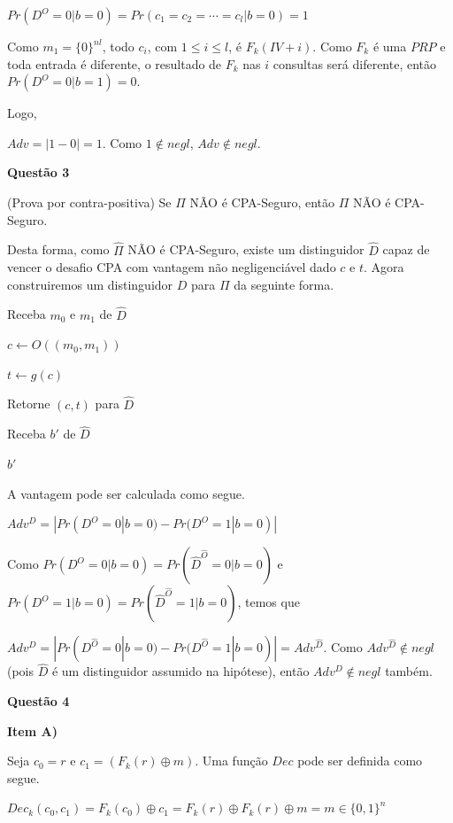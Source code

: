 \documentclass{article}
\begin{document}
    $Pr(D^O = 0 | b = 0) = Pr(c_1 = c_2 = \cdots = c_l | b = 0) = 1$

    Como $m_1 = \{0\}^{nl}$, todo $c_i$, com $1 \leq i \leq l$, é $F_k(IV + i)$. Como $F_k$ é uma $PRP$ e toda entrada é diferente, o resultado de $F_k$ nas $i$ consultas será diferente, então $Pr(D^O = 0 |b = 1) = 0$.

    Logo,

    $Adv = |1 - 0| = 1$. Como $1 \notin negl$, $Adv \notin negl$.

\textbf{Questão 3}

    (Prova por contra-positiva) Se $\hat{\Pi}$ NÃO é CPA-Seguro, então $\Pi$ NÃO é CPA-Seguro.

    Desta forma, como $\hat{\Pi}$ NÃO é CPA-Seguro, existe um distinguidor $\hat{D}$ capaz de vencer o desafio CPA com vantagem não negligenciável dado $c$ e $t$. Agora construiremos um distinguidor $D$ para $\Pi$ da seguinte forma.

    \begin{algorithm}[H]
        \caption{Distinguidor D}

        Receba $m_0$ e $m_1$ de $\hat{D}$

        $c \leftarrow O((m_0, m_1))$

        $t \leftarrow g(c)$

        Retorne $(c,t)$ para $\hat{D}$

        Receba $b'$ de $\hat{D}$

        \Return $b'$
    \end{algorithm}

    A vantagem pode ser calculada como segue.

    $Adv^D = |Pr(D^O = 0 | b = 0) - Pr(D^O = 1 | b = 0)|$

    Como $Pr(D^O = 0 | b = 0) = Pr(\hat{D}^{\hat{O}} = 0 | b = 0)$ e $Pr(D^O = 1 | b = 0) = Pr(\hat{D}^{\hat{O}} = 1 | b = 0)$, temos que

    $Adv^D = |Pr(D^{\hat{O}} = 0 | b = 0) - Pr(D^{\hat{O}} = 1 | b = 0)| = Adv^{\hat{D}}$. Como $Adv^{\hat{D}} \notin negl$ (pois $\hat{D}$ é um distinguidor assumido na hipótese), então  $Adv^D \notin negl$ também. 


\textbf{Questão 4}

\textbf{Item A)}

    Seja $c_0 = r$ e $c_1 = (F_k(r)\oplus m)$. Uma função $Dec$ pode ser definida como segue.

    $Dec_k(c_0,c_1) = F_k(c_0) \oplus c_1 = F_k(r) \oplus F_k(r) \oplus m = m \in \{0,1\}^n$
\end{document}
